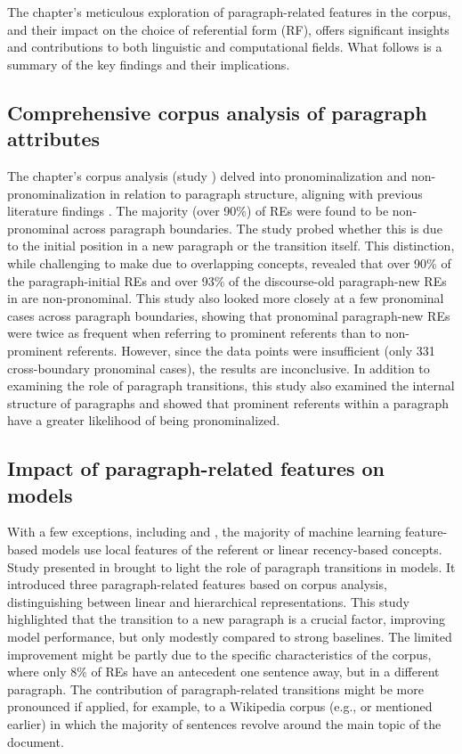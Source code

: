 The chapter's meticulous exploration of paragraph-related features in the \wsj corpus, and their impact on the choice of referential form (RF), offers significant insights and contributions to both linguistic and computational fields. What follows is a summary of the key findings and their implications.

\subsection{Comprehensive corpus analysis of paragraph attributes} 
The chapter's corpus analysis (study \studD) delved into pronominalization and non-pronominalization in relation to paragraph structure, aligning with previous literature findings \citep{Tomlin1987,Fox1987,Hofmann1989}. The majority (over 90\%) of REs were found to be non-pronominal across paragraph boundaries. The study probed whether this is due to the initial position in a new paragraph or the transition itself. This distinction, while challenging to make due to overlapping concepts, revealed that over 90\% of the paragraph-initial REs and over 93\% of the discourse-old paragraph-new REs in \wsj are non-pronominal. This study also looked more closely at a few pronominal cases across paragraph boundaries, showing that pronominal paragraph-new REs were twice as frequent when referring to prominent referents than to non-prominent referents. However, since the data points were insufficient (only 331 cross-boundary pronominal cases), the results are inconclusive. In addition to examining the role of paragraph transitions, this study also examined the internal structure of paragraphs and showed that prominent referents within a paragraph have a greater likelihood of being pronominalized.


\subsection{Impact of paragraph-related features on \context models} 
With a few exceptions, including \citet{kibrik2016referential} and \citet{castro-ferreira-etal-2016-towards-variation}, the majority of machine learning feature-based \context models use local features of the referent or linear recency-based concepts. Study \studE presented in  brought to light the role of paragraph transitions in \context models. It introduced three paragraph-related features based on corpus analysis, distinguishing between linear and hierarchical representations. This study highlighted that the transition to a new paragraph is a crucial factor, improving model performance, but only modestly compared to strong baselines. The limited improvement might be partly due to the specific characteristics of the \wsj corpus, where only 8\% of REs have an antecedent one sentence away, but in a different paragraph. The contribution of paragraph-related transitions might be more pronounced if applied, for example, to a Wikipedia corpus (e.g., \msrcor or \negcor mentioned earlier) in which the majority of sentences revolve around the main topic of the document.



